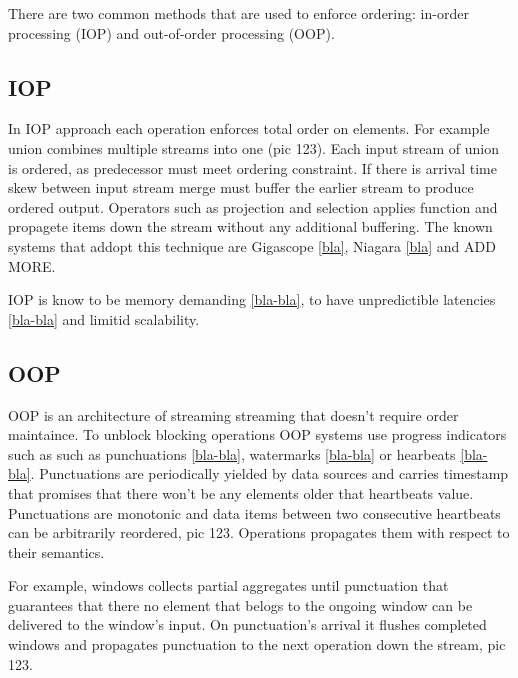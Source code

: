 
\label {fs-typical}

There are two common methods that are used to enforce ordering: in-order processing (IOP) and out-of-order processing (OOP).

\subsection{IOP}

In IOP approach each operation enforces total order on elements. For example union combines multiple streams into one (pic 123). Each input stream of union is ordered, as predecessor must meet ordering constraint. If there is arrival time skew between input stream merge must buffer the earlier stream to produce ordered output. Operators such as projection and selection applies function and propagete items down the stream without any additional buffering. The known systems that addopt this technique are Gigascope \ref{bla}, Niagara \ref{bla} and ADD MORE.

IOP is know to be memory demanding \ref{bla-bla}, to have unpredictible latencies \ref{bla-bla} and limitid scalability.

\subsection{OOP}

OOP is an architecture of streaming streaming that doesn't require order maintaince. To unblock blocking operations OOP systems use progress indicators such as such as punchuations \ref{bla-bla}, watermarks \ref{bla-bla} or hearbeats \ref{bla-bla}. Punctuations are periodically yielded by data sources and carries timestamp that promises that there won't be any elements older that heartbeats value. Punctuations are monotonic and data items between two consecutive heartbeats can be arbitrarily reordered, pic 123. Operations propagates them with respect to their semantics.

For example, windows collects partial aggregates until punctuation that guarantees that there no element that belogs to the ongoing window can be delivered to the window's input. On punctuation's arrival it flushes completed windows and propagates punctuation to the next operation down the stream, pic 123.
